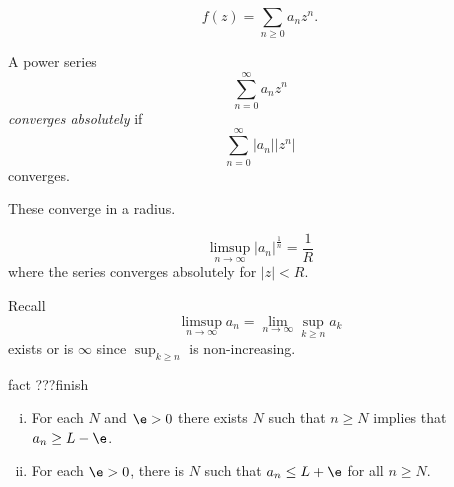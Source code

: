 \documentclass[class=article, crop=false]{standalone}
\begin{document}
  \[
    f(z) = \sum_{n \geq 0}^{} a_n z^n.
  \]

\begin{defn}
  A power series
    \[
      \sum_{n=0 }^{\infty} a_nz^n
    \]
  \emph{converges absolutely} if
    \[
      \sum_{n=0}^{\infty} |a_n||z^n|
    \]
  converges.
\end{defn}

These converge in a radius.

\begin{defn}

    \[
      \limsup_{n \to \infty} |a_n|^{\frac{1}{n}} = \frac{1}{R}
    \]
  where the series converges absolutely for $|z| < R$.
\end{defn}

Recall
  \[
    \limsup_{n \to \infty} a_n = \lim_{n\to \infty} \sup_{k \geq n} a_k
  \]
exists or is $\infty$ since $\sup_{k\geq n}$ is non-increasing.

\begin{result}{fact}
  ???finish
  \begin{enumerate}[(i)]
    \item For each $N$ and $\e > 0$ there exists $N$ such that $n \geq N$ implies that $a_n\geq L - \e$.
    \item For each $\e > 0$, there is $N$ such that $a_n \leq L + \e$ for all $n \geq N$.
  \end{enumerate}
\end{result}
\end{document}
